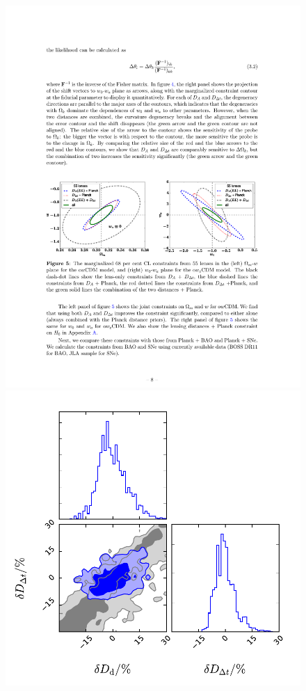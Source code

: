 \begin{figure}[!t]
\begin{minipage}{0.48\linewidth}
    \centering\includegraphics[width=\linewidth]{figures/Jee16_fig5b.pdf}
\end{minipage}\hfill
\begin{minipage}{0.48\linewidth}
    \centering\includegraphics[width=\linewidth]{figures/B1608_DdtDa.pdf}

\end{minipage}
\end{figure}
